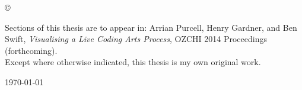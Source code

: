 
\vspace*{14cm}
\begin{center}
  \makeatletter
  \copyright\ \@author
  \makeatother
\end{center}
\noindent
\begin{center}
\end{center}
\noindent

\newpage

\vspace*{7cm}


\begin{center}
	Sections of this thesis are to appear in: Arrian Purcell, Henry Gardner, and Ben Swift, \textit{Visualising a Live Coding Arts Process}, OZCHI 2014 Proceedings (forthcoming).\\
	\vspace*{10mm}
	Except where otherwise indicated, this thesis is my own original work.
\end{center}

\vspace*{4cm}

\hspace{8cm}\makeatletter\@author\makeatother\par
\hspace{8cm}\today
